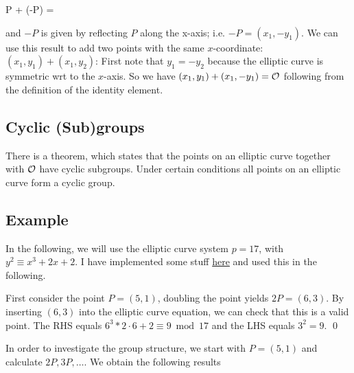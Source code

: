 \bee
P + (-P) = \Oc
\eee

and $-P$ is given by reflecting $P$ along the x-axis; i.e. $-P = (x_1, -y_1)$. We can use this result to add two points with the same $x$-coordinate: $(x_1,y_1) + (x_1,y_2)$: First note that $y_1 = -y_2$ because the elliptic curve is symmetric wrt to the $x$-axis. So we have $(x_1,y_1)+(x_1,-y_1) = \mathcal{O}$ following from the definition of the identity element.


\subsection{Cyclic (Sub)groups}

There is a theorem, which states that the points on an elliptic curve together with $\mathcal{O}$ have cyclic subgroups. Under certain conditions all points on an elliptic curve form a cyclic group.

\subsection{Example}

In the following, we will use the elliptic curve system $p = 17$, with $y^2 \equiv x^3 + 2x + 2$. I have implemented some stuff \href{https://github.com/ClemensFMN/JuliaStuff/blob/master/elliptic_curve_group.jl}{here} and used this in the following.

First consider the point $P = (5,1)$, doubling the point yields $2P = (6,3)$. By inserting $(6,3)$ into the elliptic curve equation, we can check that this is a valid point. The RHS equals $6^3 * 2\cdot 6 + 2 \equiv 9 \bmod 17$ and the LHS equals $3^2 = 9$. \qed

In order to investigate the group structure, we start with $P = (5,1)$ and calculate $2P, 3P, \ldots$. We obtain the following results




